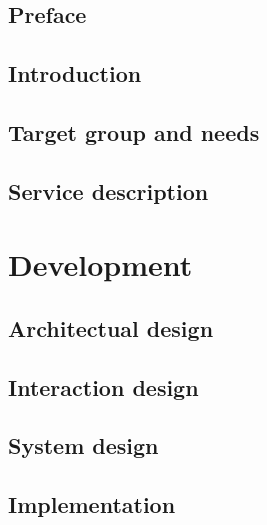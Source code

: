 \frontmatter
\chapter*{Preface}

\chapter{Introduction}


\chapter{Target group and needs}


\chapter{Service description}


\mainmatter
\part{Development}

\chapter{Architectual design}


\chapter{Interaction design}


\chapter{System design}


\chapter{Implementation}


%

%


\backmatter



